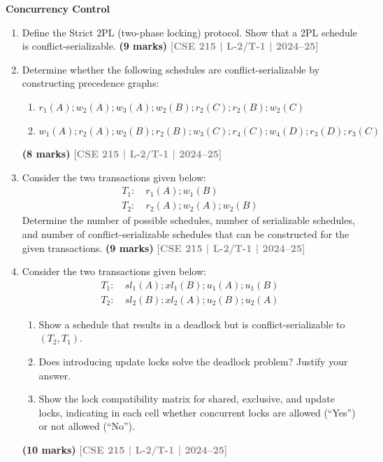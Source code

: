 \documentclass[12pt,a3paper]{article}
\newcommand{\yr}[1]{\hfill\textcolor{gray}{\small\textbf{[#1]}}}
\newcommand{\mk}[1]{\textcolor{orange!70!black}{\small\textbf{(#1 marks)}}}
\newcommand{\subtopic}[2]{%
  \vspace{10pt}
  \noindent\begin{tcolorbox}[colback=#1!8,colframe=#1,boxrule=0.6pt,arc=4pt,
    left=6pt,right=6pt,top=4pt,bottom=4pt]
    \small\bfseries\textcolor{#1}{#2}
  \end{tcolorbox}
  \vspace{2pt}
}
\begin{document}
\subtopic{cE}{Concurrency Control}
\label{sub:s7-cc}

\begin{enumerate}

\item Define the Strict 2PL (two-phase locking) protocol. Show that a 2PL schedule is conflict-serializable.
\mk{9} \yr{CSE 215 | L-2/T-1 | 2024--25}

\item Determine whether the following schedules are conflict-serializable by constructing precedence graphs:
\begin{enumerate}
  \item $r_1(A); w_2(A); w_3(A); w_2(B); r_2(C); r_2(B); w_2(C)$
  \item $w_1(A); r_2(A); w_2(B); r_2(B); w_3(C); r_4(C); w_4(D); r_3(D); r_3(C)$
\end{enumerate}
\mk{8} \yr{CSE 215 | L-2/T-1 | 2024--25}

\item Consider the two transactions given below:
\begin{align*}
T_1\colon &\ r_1(A); w_1(B)\\
T_2\colon &\ r_2(A); w_2(A); w_2(B)
\end{align*}
Determine the number of possible schedules, number of serializable schedules, and number of conflict-serializable schedules that can be constructed for the given transactions.
\mk{9} \yr{CSE 215 | L-2/T-1 | 2024--25}

\item Consider the two transactions given below:
\begin{align*}
T_1\colon &\ sl_1(A); xl_1(B); u_1(A); u_1(B)\\
T_2\colon &\ sl_2(B); xl_2(A); u_2(B); u_2(A)
\end{align*}
\begin{enumerate}
  \item Show a schedule that results in a deadlock but is conflict-serializable to $(T_2, T_1)$.
  \item Does introducing update locks solve the deadlock problem? Justify your answer.
  \item Show the lock compatibility matrix for shared, exclusive, and update locks, indicating in each cell whether concurrent locks are allowed (``Yes'') or not allowed (``No'').
\end{enumerate}
\mk{10} \yr{CSE 215 | L-2/T-1 | 2024--25}


\end{enumerate}
\end{document}
